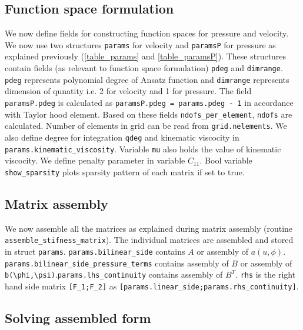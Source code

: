 \documentclass[a4paper]{book}
\begin{document}
\subsection{Function space formulation}

We now define fields for constructing function spaces for pressure and velocity. We now use two structures \verb|params| for velocity and \verb|paramsP| for pressure as explained previously (\ref{table_params} and \ref{table_paramsP}). These structures contain fields (as relevant to function space formulation) \verb|pdeg| and \verb|dimrange|. \verb|pdeg| represents polynomial degree of Ansatz function and \verb|dimrange| represents  dimension of qunatity i.e. 2 for velocity and 1 for pressure. The field \verb|paramsP.pdeg| is calculated as \verb|paramsP.pdeg = params.pdeg - 1| in accordance with Taylor hood element. Based on these fields \verb|ndofs_per_element|, \verb|ndofs| are calculated. Number of elements in grid can be read from \verb|grid.nelements|. We also define degree for integration \verb|qdeg| and kinematic viscocity in \linebreak \verb|params.kinematic_viscosity|. Variable \verb|mu| also holds the value of kinematic viscocity. We define penalty parameter in variable $C_{11}$. Bool variable \verb|show_sparsity| plots sparsity pattern of each matrix if set to true.\\

\subsection{Matrix assembly}

We now assemble all the matrices as explained during matrix assembly (routine \verb|assemble_stifness_matrix|). The individual matrices are assembled and stored in struct \verb|params|. \verb|params.bilinear_side| contains $A$ or assembly of $a(u,\phi)$. \verb|params.bilinear_side_pressure_terms| contains assembly of $B$ or assembly of \verb|b(\phi,\psi)|.\verb|params.lhs_continuity| contains assembly of $B^T$. \verb|rhs| is the right hand side matrix \verb|[F_1;F_2]| as \linebreak \verb|[params.linear_side;params.rhs_continuity]|. \\

\subsection{Solving assembled form}
\end{document}
